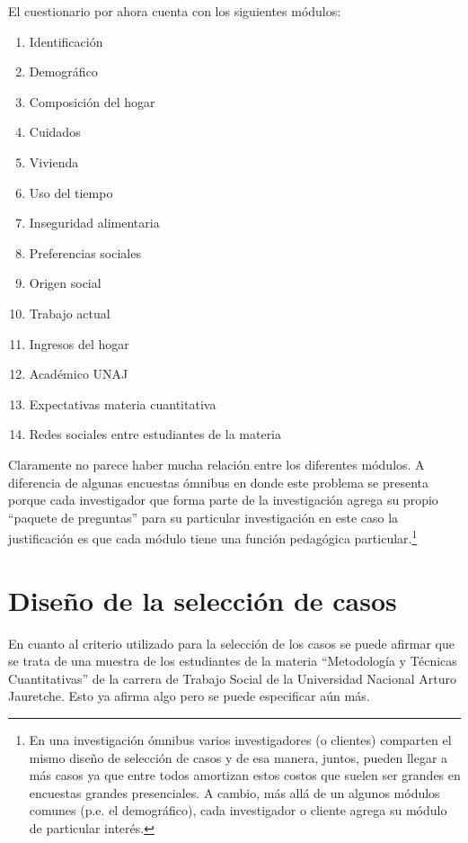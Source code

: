 \documentclass[
]{book}
\theoremstyle{definition}
\theoremstyle{definition}
\theoremstyle{definition}
\theoremstyle{definition}
\theoremstyle{remark}
\begin{document}
El cuestionario por ahora cuenta con los siguientes módulos:

\begin{enumerate}
\def\labelenumi{\arabic{enumi}.}
\item
  Identificación
\item
  Demográfico
\item
  Composición del hogar
\item
  Cuidados
\item
  Vivienda
\item
  Uso del tiempo
\item
  Inseguridad alimentaria
\item
  Preferencias sociales
\item
  Origen social
\item
  Trabajo actual
\item
  Ingresos del hogar
\item
  Académico UNAJ
\item
  Expectativas materia cuantitativa
\item
  Redes sociales entre estudiantes de la materia
\end{enumerate}

Claramente no parece haber mucha relación entre los diferentes módulos. A diferencia de algunas encuestas ómnibus en donde este problema se presenta porque cada investigador que forma parte de la investigación agrega su propio ``paquete de preguntas'' para su particular investigación en este caso la justificación es que cada módulo tiene una función pedagógica particular.\footnote{En una investigación ómnibus varios investigadores (o clientes) comparten el mismo diseño de selección de casos y de esa manera, juntos, pueden llegar a más casos ya que entre todos amortizan estos costos que suelen ser grandes en encuestas grandes presenciales. A cambio, más allá de un algunos módulos comunes (p.e. el demográfico), cada investigador o cliente agrega su módulo de particular interés.}

\hypertarget{diseuxf1o-de-la-selecciuxf3n-de-casos}{%
\section{Diseño de la selección de casos}\label{diseuxf1o-de-la-selecciuxf3n-de-casos}}

En cuanto al criterio utilizado para la selección de los casos se puede afirmar que se trata de una muestra de los estudiantes de la materia ``Metodología y Técnicas Cuantitativas'' de la carrera de Trabajo Social de la Universidad Nacional Arturo Jauretche. Esto ya afirma algo pero se puede especificar aún más.
\end{document}
